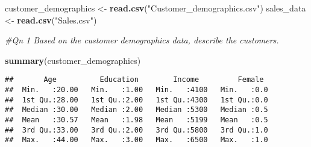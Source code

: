 \documentclass[
]{article}
\newenvironment{Shaded}{\begin{snugshade}}{\end{snugshade}}
\newcommand{\AttributeTok}[1]{\textcolor[rgb]{0.13,0.29,0.53}{#1}}
\newcommand{\CommentTok}[1]{\textcolor[rgb]{0.56,0.35,0.01}{\textit{#1}}}
\newcommand{\DecValTok}[1]{\textcolor[rgb]{0.00,0.00,0.81}{#1}}
\newcommand{\FunctionTok}[1]{\textcolor[rgb]{0.13,0.29,0.53}{\textbf{#1}}}
\newcommand{\NormalTok}[1]{#1}
\newcommand{\OtherTok}[1]{\textcolor[rgb]{0.56,0.35,0.01}{#1}}
\newcommand{\SpecialCharTok}[1]{\textcolor[rgb]{0.81,0.36,0.00}{\textbf{#1}}}
\newcommand{\StringTok}[1]{\textcolor[rgb]{0.31,0.60,0.02}{#1}}
\begin{document}
\begin{Shaded}
\begin{Highlighting}[]
\NormalTok{customer\_demographics }\OtherTok{\textless{}{-}} \FunctionTok{read.csv}\NormalTok{(}\StringTok{"Customer\_demographics.csv"}\NormalTok{)}
\NormalTok{sales\_data }\OtherTok{\textless{}{-}} \FunctionTok{read.csv}\NormalTok{(}\StringTok{"Sales.csv"}\NormalTok{)}
\end{Highlighting}
\end{Shaded}

\begin{Shaded}
\begin{Highlighting}[]
\CommentTok{\#Qn 1 Based on the customer demographics data, describe the customers.}

\FunctionTok{summary}\NormalTok{(customer\_demographics)}
\end{Highlighting}
\end{Shaded}

\begin{verbatim}
##       Age          Education        Income         Female   
##  Min.   :20.00   Min.   :1.00   Min.   :4100   Min.   :0.0  
##  1st Qu.:28.00   1st Qu.:2.00   1st Qu.:4300   1st Qu.:0.0  
##  Median :30.00   Median :2.00   Median :5300   Median :0.5  
##  Mean   :30.57   Mean   :1.98   Mean   :5199   Mean   :0.5  
##  3rd Qu.:33.00   3rd Qu.:2.00   3rd Qu.:5800   3rd Qu.:1.0  
##  Max.   :44.00   Max.   :3.00   Max.   :6500   Max.   :1.0
\end{verbatim}

\begin{Shaded}
\end{Shaded}
\end{document}
